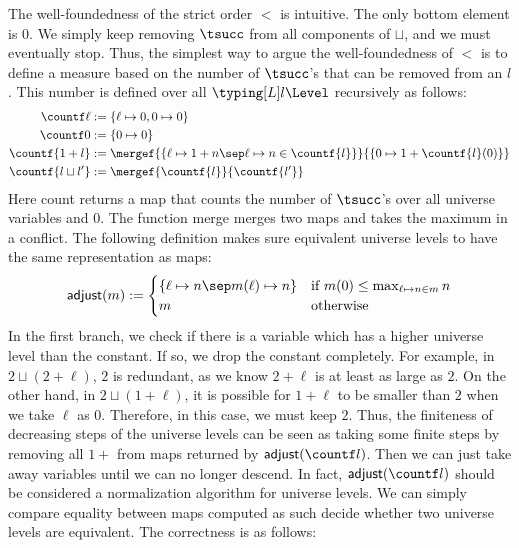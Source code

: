 The well-foundedness of the strict order $<$ is intuitive. %
The only bottom element is $0$. %
We simply keep removing $\tsucc$ from all components of $\sqcup$, and we must
eventually stop. %
Thus, the simplest way to argue the well-foundedness of $<$ is to define a measure
based on the number of $\tsucc$'s that can be removed from an $l$. %
This number is defined over all $\typing[L]l\Level$ recursively as follows:
\begin{align*}
  \countf \ell &:= \{ \ell \mapsto 0, 0 \mapsto 0 \} \\
  \countf 0 &:= \{ 0 \mapsto 0 \} \\
  \countf{1 + l} &:= \mergef{\{ \ell \mapsto 1 + n \sep \ell \mapsto n \in \countf{l}
                   \}}{\{0 \mapsto 1 + \countf{l}(0)\}} \\
  \countf{l \sqcup l'} &:= \mergef{\countf{l}}{\countf{l'}}
\end{align*}
Here \textsf{count} returns a map that counts the number of $\tsucc$'s over all
universe variables and $0$. %
The function \textsf{merge} merges two maps and takes the maximum in a conflict. %
The following definition makes sure equivalent universe levels to have the same
representation as maps:
\begin{align*}
  \adjustf m :=
  \begin{cases}
    \{ \ell \mapsto n \sep m(\ell) \mapsto n \} & \text{if $m(0) \le \max_{\ell
                                                  \mapsto n \in m} n$} \\
    m & \text{otherwise}
  \end{cases}
\end{align*}
In the first branch, we check if there is a variable which has a higher universe level
than the constant. %
If so, we drop the constant completely. %
For example, in $2 \sqcup (2 + \ell)$, $2$ is
redundant, as we know $2 + \ell$ is at least as large as $2$. %
On the other hand, in $2 \sqcup (1 + \ell)$, it is possible for $1 + \ell$
to be smaller than $2$ when we take $\ell$ as $0$. %
Therefore, in this case, we must keep $2$.  Thus, the finiteness of
decreasing steps of the universe levels can be seen as taking some finite steps by
removing all $1 +$ from maps returned by $\adjustf{\countf l}$. %
Then we can just take away variables until we can no longer descend. %
In fact, $\adjustf{\countf l}$ should be considered a normalization algorithm for
universe levels. %
We can simply compare equality between maps computed as such decide whether two
universe levels are equivalent. %
The correctness is as follows:
